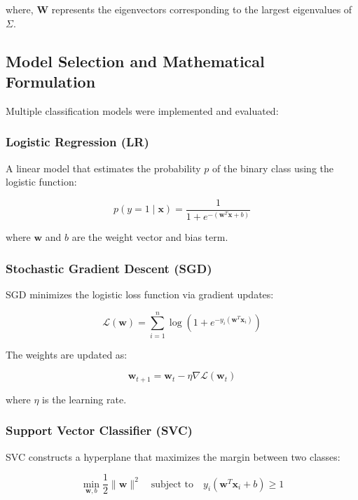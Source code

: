 \documentclass[conference]{IEEEtran}
\begin{document}
where, $\mathbf{W}$ represents the eigenvectors corresponding to the largest eigenvalues of $\Sigma$.

\subsection{\textbf{Model Selection and Mathematical Formulation}}

Multiple classification models were implemented and evaluated:

\subsubsection{\textbf{Logistic Regression (LR)}}
A linear model that estimates the probability $p$ of the binary class using the logistic function:

\begin{equation}
p(y=1 \mid \mathbf{x}) = \frac{1}{1 + e^{-(\mathbf{w}^T \mathbf{x} + b)}}
\end{equation}

where $\mathbf{w}$ and $b$ are the weight vector and bias term.

\subsubsection{\textbf{Stochastic Gradient Descent (SGD)}}
SGD minimizes the logistic loss function via gradient updates:

\begin{equation}
\mathcal{L}(\mathbf{w}) = \sum_{i=1}^{n} \log(1 + e^{-y_i (\mathbf{w}^T \mathbf{x}_i)})
\end{equation}

The weights are updated as:

\begin{equation}
\mathbf{w}_{t+1} = \mathbf{w}_t - \eta \nabla \mathcal{L}(\mathbf{w}_t)
\end{equation}

where $\eta$ is the learning rate.

\subsubsection{\textbf{Support Vector Classifier (SVC)}}
SVC constructs a hyperplane that maximizes the margin between two classes:

\begin{equation}
\min_{\mathbf{w}, b} \frac{1}{2} \|\mathbf{w}\|^2 \quad \text{subject to} \quad y_i (\mathbf{w}^T \mathbf{x}_i + b) \geq 1
\end{equation}
\end{document}
